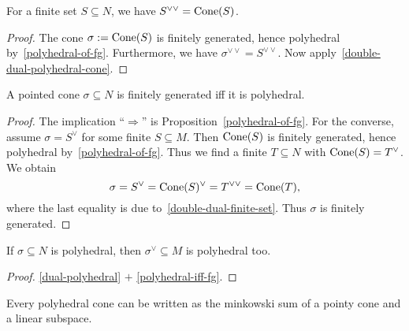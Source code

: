 \begin{proposition}
  \label{double-dual-finite-set}
  \uses{}
  \leanok
  For a finite set \( S \subseteq N \), we have \( S^{\vee\vee} =
  \operatorname{Cone}(S) \).
\end{proposition}
\begin{proof}
  \leanok
  The cone \( \sigma := \operatorname{Cone}(S) \) is finitely generated, hence
  polyhedral by~\ref{polyhedral-of-fg}. Furthermore, we have \(
  \sigma^{\vee\vee} = S^{\vee\vee} \). Now
  apply~\ref{double-dual-polyhedral-cone}.
\end{proof}

\begin{proposition}[Polyhedral = Finitely generated]
  \label{polyhedral-iff-fg}
  \uses{}
  \leanok
  A pointed cone \( \sigma \subseteq N \) is finitely generated iff it is
  polyhedral.
\end{proposition}
\begin{proof}
  \leanok
  The implication ``\( \Rightarrow \)'' is
  Proposition~\ref{polyhedral-of-fg}. For the converse, assume
  \( \sigma = S^{\vee} \) for some finite \( S \subseteq M \). Then \(
  \operatorname{Cone}(S) \) is finitely generated, hence polyhedral
  by~\ref{polyhedral-of-fg}. Thus we find a finite \( T
  \subseteq N \) with \( \operatorname{Cone}(S) = T^\vee \). We obtain
  \[
      \sigma = S^{\vee} = \operatorname{Cone}(S)^\vee = T^{\vee\vee} = \operatorname{Cone}(T),
  \]
  where the last equality is due
  to~\ref{double-dual-finite-set}. Thus \( \sigma \) is finitely
  generated.
\end{proof}

\begin{proposition}
  \label{dual-polyhedral-cone}
  \leanok
  If \( \sigma \subseteq N \) is
  polyhedral, then \( \sigma^\vee \subseteq M \) is polyhedral too.
\end{proposition}
\begin{proof}
  \leanok
  \ref{dual-polyhedral} \( + \) \ref{polyhedral-iff-fg}.
\end{proof}

\begin{proposition}
  \label{pointy-linear-sum-polyhedral-cone}
  Every polyhedral cone can be written as the minkowski sum of a pointy cone and a linear subspace.
\end{proposition} %


